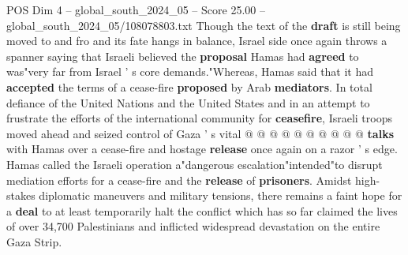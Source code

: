 \begin{textsample}{POS Dim 4 – global\_south\_2024\_05 – Score 25.00 – global\_south\_2024\_05/108078803.txt}
Though the text of the \textbf{draft} is still being moved to and fro and its fate hangs in balance, Israel side once again throws a spanner saying that Israeli believed the \textbf{proposal} Hamas had \textbf{agreed} to was"very far from Israel ' s core demands."Whereas, Hamas said that it had \textbf{accepted} the terms of a cease-fire \textbf{proposed} by Arab \textbf{mediators}.
In total defiance of the United Nations and the United States and in an attempt to frustrate the efforts of the international community for \textbf{ceasefire}, Israeli troops moved ahead and seized control of Gaza ' s vital @ @ @ @ @ @ @ @ @ @ \textbf{talks} with Hamas over a cease-fire and hostage \textbf{release} once again on a razor ' s edge.
Hamas called the Israeli operation a"dangerous escalation"intended"to disrupt mediation efforts for a cease-fire and the \textbf{release} of \textbf{prisoners}.
Amidst high-stakes diplomatic maneuvers and military tensions, there remains a faint hope for a \textbf{deal} to at least temporarily halt the conflict which has so far claimed the lives of over 34,700 Palestinians and inflicted widespread devastation on the entire Gaza Strip.

\end{textsample}
